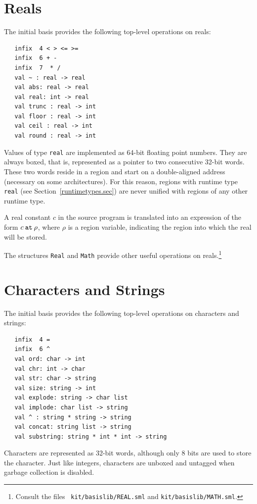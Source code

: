 \documentclass[12pt]{book}
\begin{document}
\section{Reals}
The 
%
initial basis provides the following top-level operations on reals:
%
%
%
%
%
%
%
%
%
%
%
%
%
%
%
%
%
\begin{verbatim}
   infix  4 < > <= >= 
   infix  6 + - 
   infix  7  * /
   val ~ : real -> real
   val abs: real -> real
   val real: int -> real
   val trunc : real -> int
   val floor : real -> int
   val ceil : real -> int
   val round : real -> int
\end{verbatim}
Values of type {\tt real} are implemented as 64-bit floating point
numbers.  They are always boxed, that is, represented as a pointer to
two consecutive 32-bit 
%
words.  These two words reside in a region and start on a
double-aligned address (necessary on some architectures). For this
reason, regions with
%
runtime type {\tt real} (see
Section~\ref{runtimetypes.sec}) are never unified with regions of any
other runtime type.

A real constant $c$ in the source program is translated into an
expression of the form 
%
$c\mathbin{\hbox{\tt at}}\rho$, where $\rho$ is a region variable, indicating the region
into which the real will be stored.

The structures {\tt Real} and {\tt Math} provide other useful
operations on reals.\footnote{Consult the files {\tt
    kit/basislib/REAL.sml} and {\tt kit/basislib/MATH.sml}.}

\section{Characters and Strings}
The 
%
initial basis provides the following top-level operations on characters and strings:
%
%
%
%
%
%
%
%
%
%
\begin{verbatim}
   infix  4 = 
   infix  6 ^
   val ord: char -> int
   val chr: int -> char
   val str: char -> string
   val size: string -> int
   val explode: string -> char list
   val implode: char list -> string
   val ^ : string * string -> string
   val concat: string list -> string
   val substring: string * int * int -> string
\end{verbatim}
Characters are represented as 32-bit words, although only 8 bits are
used to store the character. Just like integers, characters are
unboxed and untagged when garbage collection is disabled.
\end{document}

